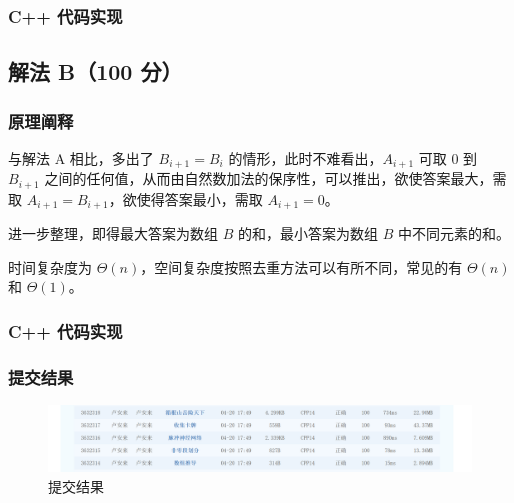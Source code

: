 \subsubsection{C++ 代码实现}

\subsection{解法 B（100 分）}
\subsubsection{原理阐释}
\par 与解法 A 相比，多出了 $B_{i+1}=B_i$ 的情形，此时不难看出，$A_{i+1}$ 可取 $0$ 到 $B_{i+1}$ 之间的任何值，从而由自然数加法的保序性，可以推出，欲使答案最大，需取 $A_{i+1}=B_{i+1}$，欲使得答案最小，需取 $A_{i+1}=0$。
\par 进一步整理，即得最大答案为数组 $B$ 的和，最小答案为数组 $B$ 中不同元素的和。
\par 时间复杂度为 $\Theta(n)$，空间复杂度按照去重方法可以有所不同，常见的有 $\Theta(n)$ 和 $\Theta(1)$。
\subsubsection{C++ 代码实现}

\subsubsection{提交结果}
\begin{figure}[htbp]
	\centering
	\includegraphics[width=1\textwidth]{result.png}
	\caption{提交结果}
\end{figure}